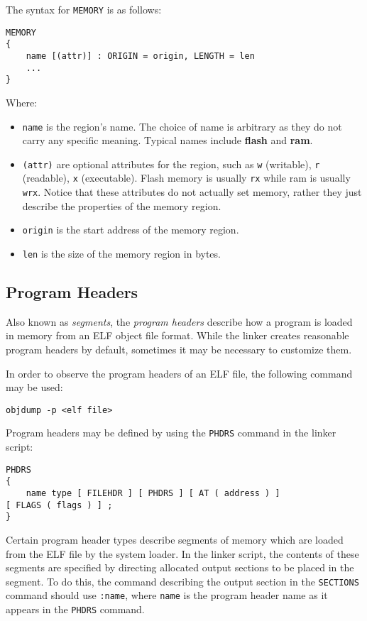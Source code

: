 \documentclass[a4paper,12pt,twoside]{report}
\begin{document}
                The syntax for \verb|MEMORY| is as follows:
                \begin{verbatim}
MEMORY
{
    name [(attr)] : ORIGIN = origin, LENGTH = len
    ...
}
                \end{verbatim}
            	Where:
            	\begin{itemize}
            		\item \verb|name| is the region's name. The choice of name is arbitrary as they do not carry any specific meaning. Typical names include \textbf{flash} and \textbf{ram}.
            		\item \verb|(attr)| are optional attributes for the region, such as \verb|w| (writable), \verb|r| (readable), \verb|x| (executable). Flash memory is usually \verb|rx| while ram is usually \verb|wrx|. Notice that these attributes do not actually set memory, rather they just describe the properties of the memory region.
            		\item \verb|origin| is the start address of the memory region.
            		\item \verb|len| is the size of the memory region in bytes.
            	\end{itemize}

            \subsection{Program Headers}
                Also known as \textit{segments}, the \textit{program headers} describe how a program is loaded in memory from an ELF object file format. While the linker creates reasonable program headers by default, sometimes it may be necessary to customize them.\cite{gnuldProgramHeaders}

                In order to observe the program headers of an ELF file, the following command may be used:
\begin{verbatim}
objdump -p <elf file>
\end{verbatim}

                Program headers may be defined by using the \lstinline|PHDRS| command in the linker script:
\begin{verbatim}
PHDRS
{
    name type [ FILEHDR ] [ PHDRS ] [ AT ( address ) ]
[ FLAGS ( flags ) ] ;
}
\end{verbatim}

                Certain program header types describe segments of memory which are loaded from the ELF file by the system loader. In the linker script, the contents of these segments are specified by directing allocated output sections to be placed in the segment. To do this, the command describing the output section in the \lstinline|SECTIONS| command should use \lstinline|:name|, where \lstinline|name| is the program header name as it appears in the \lstinline|PHDRS| command.\cite{gnuldProgramHeaders}
\end{document}
